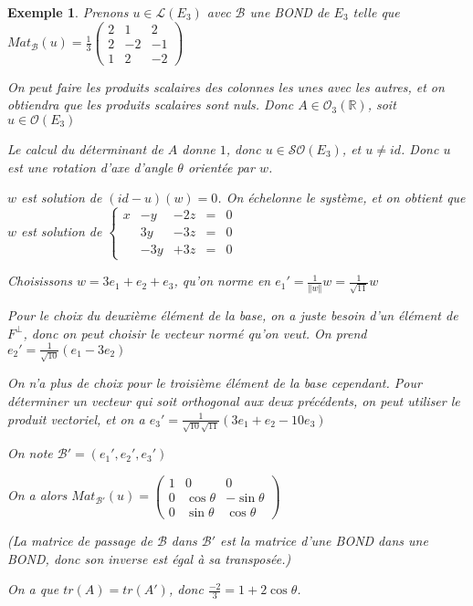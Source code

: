 \documentclass[a4paper,12pt]{book}
\newtheorem{Exe}{Exemple}[section]
\def\R{\mathbb{R}}
\begin{document}
\begin{Exe}
Prenons $u\in\mathcal{L}(E_3)$ avec $\mathcal{B}$ une BOND de $E_3$ telle que $Mat_\mathcal{B}(u) = \frac{1}{3}\begin{pmatrix} 2 & 1 & 2 \\ 2 & -2 & -1 \\ 1 & 2 & -2\end{pmatrix}$
\par On peut faire les produits scalaires des colonnes les unes avec les autres, et on obtiendra que les produits scalaires sont nuls. Donc $A\in\mathcal{O}_3(\R)$, soit $u\in\mathcal{O}(E_3)$
\par Le calcul du déterminant de $A$ donne $1$, donc $u\in\mathcal{SO}(E_3)$, et $u\neq id$. Donc $u$ est une rotation d'axe d'angle $\theta$ orientée par $w$.
\par $w$ est solution de $(id-u)(w)=0$. On échelonne le système, et on obtient que $w$ est solution de $\left\{\begin{array}{ccccl} x & -y & -2z & = & 0 \\ & 3y & -3z & = & 0 \\ & -3y & +3z & = & 0\end{array}\right.$
\par Choisissons $w = 3e_1+e_2+e_3$, qu'on norme en $e_1' = \frac{1}{\Vert w\Vert}w=\frac{1}{\sqrt{11}}w$
\par Pour le choix du deuxième élément de la base, on a juste besoin d'un élément de $F^\perp$, donc on peut choisir le vecteur normé qu'on veut. On prend $e_2' = \frac{1}{\sqrt{10}}(e_1-3e_2)$
\par On n'a plus de choix pour le troisième élément de la base cependant. Pour déterminer un vecteur qui soit orthogonal aux deux précédents, on peut utiliser le produit vectoriel, et on a $e_3' = \frac{1}{\sqrt{10}\sqrt{11}}(3e_1+e_2-10e_3)$
\par On note $\mathcal{B}' = (e_1', e_2', e_3')$
\par On a alors $Mat_{\mathcal{B}'}(u) = \begin{pmatrix} 1 & 0 & 0 \\ 0 & \cos\theta & -\sin\theta \\ 0 & \sin\theta & \cos\theta\end{pmatrix}$
\par (La matrice de passage de $\mathcal{B}$ dans $\mathcal{B}'$ est la matrice d'une BOND dans une BOND, donc son inverse est égal à sa transposée.)
\par On a que $tr(A)=tr(A')$, donc $\frac{-2}{3} = 1 + 2\cos\theta$.

\end{Exe}
\end{document}
